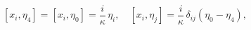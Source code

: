 \begin{equation}\label{11}
  [x_i, \eta_4] = [x_i, \eta_0] =\frac{i}\kappa\, \eta_i, \quad [x_i, \eta_j] = \frac{i}\kappa\,
\delta_{ij}(\eta_0 - \eta_4),
\end{equation}


